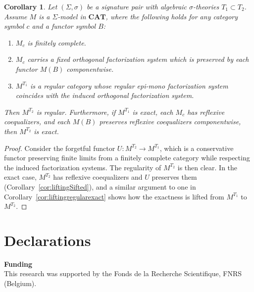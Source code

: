 \documentclass[11pt]{article}
\theoremstyle{plain}
\newtheorem{corollary}[theorem]{Corollary}
\theoremstyle{definition}
\numberwithin{equation}{section}
\newcommand{\CAT}{\mathbf{CAT}}
\begin{document}
\begin{corollary}
    Let $(\Sigma,\sigma)$ be a signature pair with algebraic $\sigma$-theories $T_1\subset T_2$. Assume $M$ is a $\Sigma$-model in $\CAT$, where the following holds for any category symbol $c$ and a functor symbol $B$:
    \begin{enumerate}
        \item $M_c$ is finitely complete.
        \item $M_c$ carries a fixed orthogonal factorization system which is preserved by each functor $M(B)$ componentwise.
        \item $M^{T_1}$ is a regular category whose regular epi-mono factorization system coincides with the induced orthogonal factorization system. 
    \end{enumerate}
    Then $M^{T_2}$ is regular. Furthermore, if $M^{T_1}$ is exact, each $M_c$ has reflexive coequalizers, and each $M(B)$ preserves reflexive coequalizers componentwise, then $M^{T_2}$ is exact. 
\end{corollary}
\begin{proof}
    Consider the forgetful functor $U\colon M^{T_2}\to M^{T_1}$, which is a conservative functor preserving finite limits from a finitely complete category while respecting the induced factorization systems. The regularity of $M^{T_2}$ is then clear. In the exact case, $M^{T_2}$ has reflexive coequalizers and $ U$ preserves them (Corollary~\ref{cor:liftingSifted}), and a similar argument to one in Corollary~\ref{cor:liftingregularexact} shows how the exactness is lifted from  $M^{T_1}$ to $M^{T_2}$. 
\end{proof}
\section*{Declarations}
\textbf{Funding} \\
\noindent
This research was supported by the Fonds de la Recherche Scientifique, FNRS (Belgium).
\end{document}

